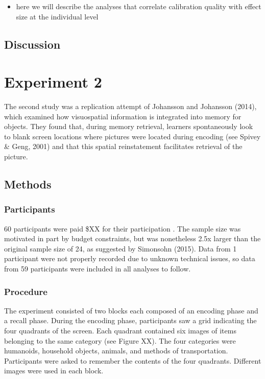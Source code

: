 \documentclass[
  english,
  man,floatsintext]{apa6}
\providecommand{\tightlist}{%
  \setlength{\itemsep}{0pt}\setlength{\parskip}{0pt}}
\begin{document}
\begin{itemize}
\tightlist
\item
  here we will describe the analyses that correlate calibration quality with effect size at the individual level
\end{itemize}

\hypertarget{discussion}{%
\subsection{Discussion}\label{discussion}}

\hypertarget{experiment-2}{%
\section{Experiment 2}\label{experiment-2}}

The second study was a replication attempt of Johansson and Johansson (2014), which examined how visuospatial information is integrated into memory for objects. They found that, during memory retrieval, learners spontaneously look to blank screen locations where pictures were located during encoding (see Spivey \& Geng, 2001) and that this spatial reinstatement facilitates retrieval of the picture.

\hypertarget{methods-1}{%
\subsection{Methods}\label{methods-1}}

\hypertarget{participants-2}{%
\subsubsection{Participants}\label{participants-2}}

60 participants were paid \$XX for their participation . The sample size was motivated in part by budget constraints, but was nonetheless 2.5x larger than the original sample size of 24, as suggested by Simonsohn (2015). Data from 1 participant were not properly recorded due to unknown technical issues, so data from 59 participants were included in all analyses to follow.

\hypertarget{procedure-1}{%
\subsubsection{Procedure}\label{procedure-1}}

The experiment consisted of two blocks each composed of an encoding phase and a recall phase. During the encoding phase, participants saw a grid indicating the four quadrants of the screen. Each quadrant contained six images of items belonging to the same category (see Figure XX). The four categories were humanoids, household objects, animals, and methods of transportation. Participants were asked to remember the contents of the four quadrants. Different images were used in each block.
\end{document}
